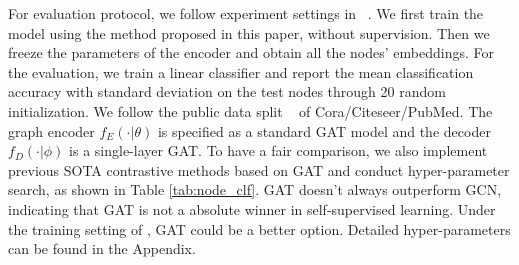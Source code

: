 {For evaluation protocol, we follow experiment settings in ~\cite{velivckovic2018deep,hassani2020contrastive,thakoor2021bootstrapped,zhang2021canonical}. We first train the model using the method proposed in this paper, without supervision. Then we freeze the parameters of the encoder and obtain all the nodes' embeddings. For the evaluation, we train a linear classifier and report the mean classification accuracy with standard deviation on the test nodes through 20 random initialization. We follow the public data split ~\cite{velivckovic2018deep,hassani2020contrastive,zhang2021canonical}  of Cora/Citeseer/PubMed. The graph encoder $f_E(·|\theta)$ is specified as a standard GAT model and the decoder $f_D(·|\phi)$ is a single-layer GAT. To have a fair comparison, we also implement previous SOTA contrastive methods based on GAT and conduct hyper-parameter search, as shown in Table \ref{tab:node_clf}. GAT doesn't always outperform GCN, indicating that GAT is not a absolute winner in self-supervised learning. Under the training setting of \model, GAT could be a better option.
Detailed hyper-parameters can be found in the Appendix.


}
